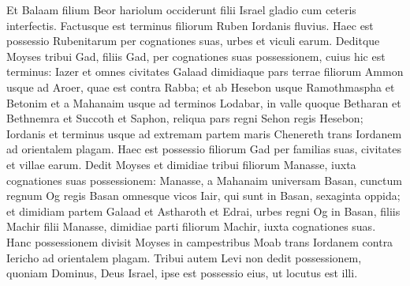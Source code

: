 \begin{biblechapter}
\verse Et Balaam filium Beor hariolum occiderunt filii Israel gladio cum ceteris interfectis.  
\verse Factusque est terminus filiorum Ruben Iordanis fluvius. Haec est possessio Rubenitarum per cognationes suas, urbes et viculi earum. 
\verse Deditque Moyses tribui Gad, filiis Gad, per cognationes suas possessionem, cuius hic est 
\verse terminus: Iazer et omnes civitates Galaad dimidiaque pars terrae filiorum Ammon usque ad Aroer, quae est contra Rabba; 
\verse et ab Hesebon usque Ramothmaspha et Betonim et a Mahanaim usque ad terminos Lodabar,  
\verse in valle quoque Betharan et Bethnemra et Succoth et Saphon, reliqua pars regni Sehon regis Hesebon; Iordanis et terminus usque ad extremam partem maris Chenereth trans Iordanem ad orientalem plagam. 
\verse Haec est possessio filiorum Gad per familias suas, civitates et villae earum. 
\verse Dedit Moyses et dimidiae tribui filiorum Manasse, iuxta cognationes suas possessionem: 
\verse Manasse, a Mahanaim universam Basan, cunctum regnum Og regis Basan omnesque vicos Iair, qui sunt in Basan, sexaginta oppida; 
\verse et dimidiam partem Galaad et Astharoth et Edrai, urbes regni Og in Basan, filiis Machir filii Manasse, dimidiae parti filiorum Machir, iuxta cognationes suas. 
\verse Hanc possessionem divisit Moyses in campestribus Moab trans Iordanem contra Iericho ad orientalem plagam. 
\verse Tribui autem Levi non dedit possessionem, quoniam Dominus, Deus Israel, ipse est possessio eius, ut locutus est illi. 
\end{biblechapter}

